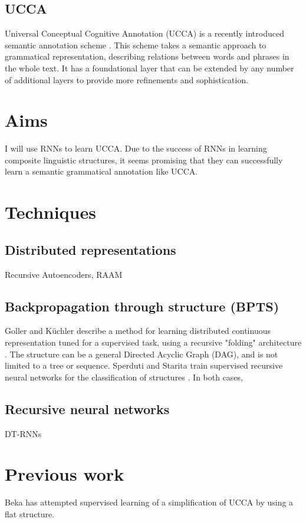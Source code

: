 \documentclass[11pt]{article} \usepackage{cite}
\begin{document}
\subsection{UCCA}

Universal Conceptual Cognitive Annotation (UCCA) is a recently introduced
semantic annotation scheme \cite{abend2013universal}. This scheme takes a
semantic approach to grammatical representation, describing relations between
words and phrases in the whole text. It has a foundational layer that can be
extended by any number of additional layers to provide more refinements and
sophistication.


\section{Aims}

I will use RNNs to learn UCCA. Due to the success of RNNs in learning composite
linguistic structures, it seems promising that they can successfully learn a
semantic grammatical annotation like UCCA.


\section{Techniques}

\subsection{Distributed representations}

Recursive Autoencoders, RAAM

\subsection{Backpropagation through structure (BPTS)}

Goller and K{\"u}chler describe a method for learning distributed continuous
representation tuned for a supervised task, using a recursive "folding"
architecture \cite{goller1996learning}. The structure can be a general Directed
Acyclic Graph (DAG), and is not limited to a tree or sequence. Sperduti and
Starita train supervised recursive neural networks for the classification of
structures \cite{sperduti1997supervised}. In both cases, 

\subsection{Recursive neural networks}

DT-RNNs


\section{Previous work}

Beka \cite{beka2013thesis} has attempted supervised learning of a simplification
of UCCA by using a flat structure.


{}  
\end{document}
